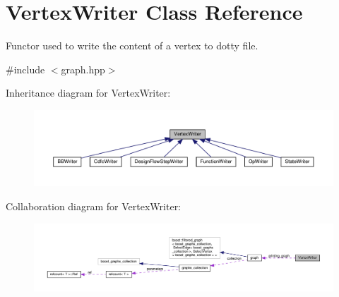 \hypertarget{classVertexWriter}{}\section{Vertex\+Writer Class Reference}
\label{classVertexWriter}


Functor used to write the content of a vertex to dotty file.  




{\ttfamily \#include $<$graph.\+hpp$>$}



Inheritance diagram for Vertex\+Writer\+:
\nopagebreak
\begin{figure}[H]
\begin{center}
\leavevmode
\includegraphics[width=350pt]{d7/d6f/classVertexWriter__inherit__graph}
\end{center}
\end{figure}


Collaboration diagram for Vertex\+Writer\+:
\nopagebreak
\begin{figure}[H]
\begin{center}
\leavevmode
\includegraphics[width=350pt]{d2/d14/classVertexWriter__coll__graph}
\end{center}
\end{figure}
